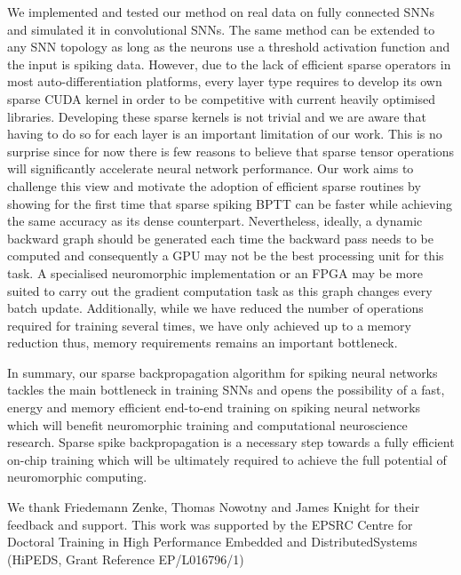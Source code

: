 \documentclass{article}
\begin{document}
We implemented and tested our method on real data on fully connected SNNs and simulated it in convolutional SNNs. The same method can be extended to any SNN topology as long as the neurons use a threshold activation function and the input is spiking data. However, due to the lack of efficient sparse operators in most auto-differentiation platforms, every layer type requires to develop its own sparse CUDA kernel in order to be competitive with current heavily optimised libraries. Developing these sparse kernels is not trivial and we are aware that having to do so for each layer is an important limitation of our work. This is no surprise since for now there is few reasons to believe that sparse tensor operations will significantly accelerate neural network performance. Our work aims to challenge this view and motivate the adoption of efficient sparse routines by showing for the first time that sparse spiking BPTT can be faster while achieving the same accuracy as its dense counterpart. Nevertheless, ideally, a dynamic backward graph should be generated each time the backward pass needs to be computed and consequently a GPU may not be the best processing unit for this task. A specialised neuromorphic implementation or an FPGA may be more suited to carry out the gradient computation task as this graph changes every batch update. Additionally, while we have reduced the number of operations required for training several times, we have only achieved up to a  memory reduction thus, memory requirements remains an important bottleneck. 

In summary, our sparse backpropagation algorithm for spiking neural networks tackles the main bottleneck in training SNNs and opens the possibility of a fast, energy and memory efficient end-to-end training on spiking neural networks which will benefit neuromorphic training and computational neuroscience research. Sparse spike backpropagation is a necessary step towards a fully efficient on-chip training which will be ultimately required to achieve the full potential of neuromorphic computing.

\begin{ack}
We thank Friedemann Zenke, Thomas Nowotny and James Knight for their feedback and support. This work was supported by the EPSRC Centre for Doctoral Training in High Performance Embedded and DistributedSystems (HiPEDS, Grant Reference EP/L016796/1)
\end{ack}



\end{document}
